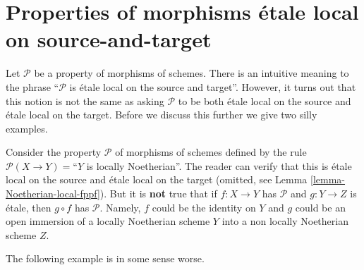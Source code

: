 \section{Properties of morphisms \'etale local on source-and-target}
\label{section-properties-etale-local-source-target}

\noindent
Let $\mathcal{P}$ be a property of morphisms of schemes. There is an
intuitive meaning to the phrase ``$\mathcal{P}$ is \'etale local on the
source and target''. However, it turns out that this notion is not
the same as asking $\mathcal{P}$ to be both \'etale
local on the source and \'etale local on the target.
Before we discuss this further we give two silly examples.

\begin{example}
\label{example-silly-one}
Consider the property $\mathcal{P}$ of morphisms of schemes defined
by the rule $\mathcal{P}(X \to Y) = $``$Y$ is locally Noetherian''.
The reader can verify that this is \'etale local on the source and
\'etale local on the target (omitted, see
Lemma \ref{lemma-Noetherian-local-fppf}).
But it is {\bf not} true that if $f : X \to Y$ has $\mathcal{P}$
and $g : Y \to Z$ is \'etale, then $g \circ f$ has $\mathcal{P}$.
Namely, $f$ could be the identity on $Y$ and $g$ could be an open
immersion of a locally Noetherian scheme $Y$ into a non locally Noetherian
scheme $Z$.
\end{example}

\noindent
The following example is in some sense worse.

